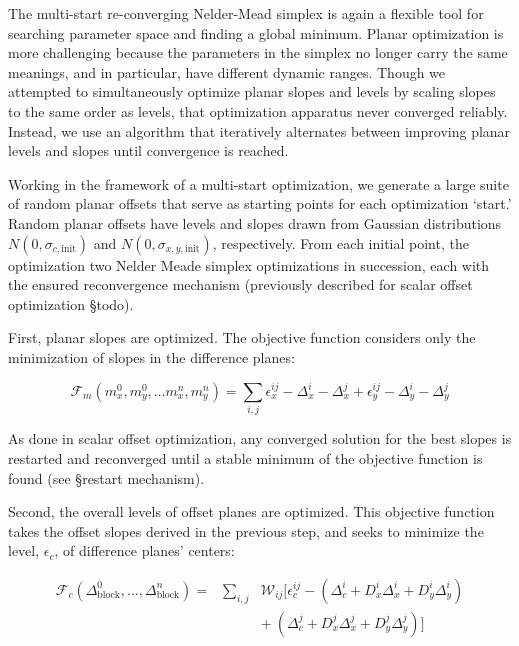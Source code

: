 \documentclass[iop]{emulateapj}
\newcommand{\todo}[1]{\textcolor{RedOrange}{#1}} %
\begin{document}
The multi-start re-converging Nelder-Mead simplex is again a flexible tool for searching parameter space and finding a global minimum. Planar optimization is more challenging because the parameters in the simplex no longer carry the same meanings, and in particular, have different dynamic ranges. Though we attempted to simultaneously optimize planar slopes and levels by scaling slopes to the same order as levels, that optimization apparatus never converged reliably. Instead, we use an algorithm that iteratively alternates between improving planar levels and slopes until convergence is reached.

Working in the framework of a multi-start optimization, we generate a large suite of random planar offsets that serve as starting points for each optimization `start.' Random planar offsets have levels and slopes drawn from Gaussian distributions $N(0, \sigma_{c,\mathrm{init}})$ and $N(0, \sigma_{x,y,\mathrm{init}})$, respectively. From each initial point, the optimization two Nelder Meade simplex optimizations in succession, each with the ensured reconvergence mechanism (previously described for scalar offset optimization \S \todo{todo}).

First, planar slopes are optimized. The objective function considers only the minimization of slopes in the difference planes:

\begin{equation}
	\mathcal{F}_m(m_x^0,m_y^0,\ldots m_x^n, m_y^n) = \sum_{i,j} \epsilon_x^{ij} - \Delta_x^i - \Delta_x^j + \epsilon_y^{ij} - \Delta_y^i - \Delta_y^j
\end{equation}

\noindent As done in scalar offset optimization, any converged solution for the best slopes is restarted and reconverged until a stable minimum of the objective function is found (see \S \todo{restart mechanism}).

Second, the overall levels of offset planes are optimized. This objective function takes the offset slopes derived in the previous step, and seeks to minimize the level, $\epsilon_c$, of difference planes' centers:

\begin{eqnarray}\nonumber
	\mathcal{F}_c(\Delta_\mathrm{block}^0,\ldots,\Delta_\mathrm{block}^n) = &\sum_{i,j}& \mathcal{W}_{ij} [ \epsilon^{ij}_c - (\Delta_c^i + D_x^i\Delta_x^i + D_y^i\Delta_y^i) \\
	&& +~(\Delta_c^j + D_x^j\Delta_x^j + D_y^j\Delta_y^j) ]
\end{eqnarray}
\end{document}
